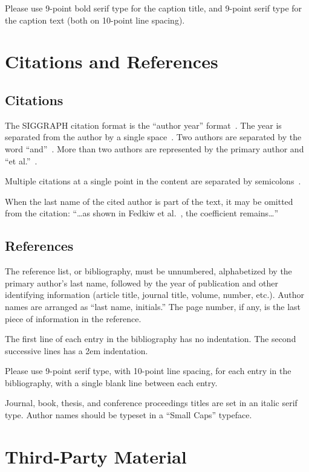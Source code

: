 \documentclass[tog]{acmsiggraph}
\begin{document}
Please use 9-point bold serif type for the caption title, and 9-point
serif type for the caption text (both on 10-point line spacing).

\section{Citations and References}

\subsection{Citations}

The SIGGRAPH citation format is the ``author year''
format~\cite{Pellacini:2005:LAH}. The year is separated from the
author by a single space~\cite{yee:2000:ssa}. Two authors are
separated by the word ``and''~\cite{parke:1996:CFA}. More than two
authors are represented by the primary author and ``et al.''~\cite{levoy:2000:TDM}.

Multiple citations at a single point in the content are separated by
semicolons~\cite{levoy:2000:TDM,sako:2001:SSB}.

When the last name of the cited author is part of the text, it may be
omitted from the citation: ``\ldots as shown in Fedkiw et
al.~, the coefficient remains\ldots''

\subsection{References}

The reference list, or bibliography, must be unnumbered, alphabetized
by the primary author's last name, followed by the year of publication
and other identifying information (article title, journal title,
volume, number, etc.). Author names are arranged as ``last name,
initials.'' The page number, if any, is the last piece of information
in the reference.

The first line of each entry in the bibliography has no
indentation. The second successive lines has a 2em
indentation. 

Please use 9-point serif type, with 10-point line spacing, for each
entry in the bibliography, with a single blank line between each
entry. 

Journal, book, thesis, and conference proceedings titles are set in an
italic serif type. {\sc Author names should be typeset in a ``Small
Caps'' typeface.}

\section{Third-Party Material}
\end{document}
